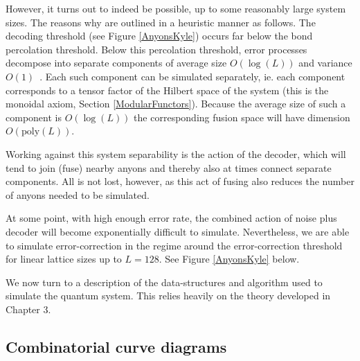 However, it turns out to indeed be possible, up to some reasonably
large system sizes. 
The reasons why are outlined in a heuristic manner as follows.
The decoding threshold (see Figure \ref{AnyonsKyle})
occurs far below the bond percolation threshold.
Below this percolation threshold, error processes 
decompose into separate components of
average size $O(\log(L))$ and variance $O(1)$~\cite{Bazant2000}.
Each such component can be simulated separately, ie.
each component corresponds to a tensor factor of the
Hilbert space of the system 
(this is the monoidal axiom, Section \ref{ModularFunctors}).
Because the average size of such a component
is $O(\log(L))$ the corresponding fusion space will have 
dimension $O(\mathrm{poly}(L)).$

Working against this system separability is the
action of the decoder, which will tend to join (fuse)
nearby anyons and thereby also at times connect separate
components. 
All is not lost, however, as this act of fusing also
reduces the number of anyons needed to be simulated.

At some point, with high enough error rate, the combined action of
noise plus decoder will become exponentially difficult to simulate.
Nevertheless, we are able to simulate error-correction in
the regime around the error-correction threshold for linear lattice sizes up to $L=128$.
See Figure \ref{AnyonsKyle} below.

We now turn to a description of the data-structures and algorithm
used to simulate the quantum system.
This relies heavily on the theory developed in Chapter 3.

%
%

\subsection{Combinatorial curve diagrams}

